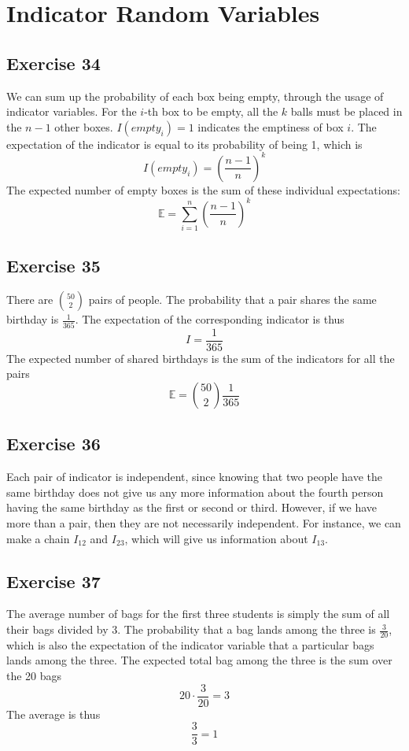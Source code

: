 \documentclass{book}
\begin{document}
\section{Indicator Random Variables}

\subsection*{Exercise 34}
We can sum up the probability of each box being empty, through the usage of indicator variables. For the $i$-th box to be empty, all the $k$ balls must be placed in the $n - 1$ other boxes. $I(empty_i) = 1$ indicates the emptiness of box $i$. The expectation of the indicator is equal to its probability of being 1, which is
$$I(empty_i) = \left( \frac{n - 1}{n} \right)^k$$
The expected number of empty boxes is the sum of these individual expectations:
$$\mathbb{E} = \sum_{i = 1}^n \left( \frac{n - 1}{n} \right)^k$$

\subsection*{Exercise 35}
There are $\binom{50}{2}$ pairs of people. The probability that a pair shares the same birthday is $\frac{1}{365}$. The expectation of the corresponding indicator is thus
$$I = \frac{1}{365}$$
The expected number of shared birthdays is the sum of the indicators for all the pairs
$$\mathbb{E} = \binom{50}{2} \frac{1}{365}$$

\subsection*{Exercise 36}
Each pair of indicator is independent, since knowing that two people have the same birthday does not give us any more information about the fourth person having the same birthday as the first or second or third. However, if we have more than a pair, then they are not necessarily independent. For instance, we can make a chain $I_{12}$ and $I_{23}$, which will give us information about $I_{13}$.

\subsection*{Exercise 37}
The average number of bags for the first three students is simply the sum of all their bags divided by 3. The probability that a bag lands among the three is $\frac{3}{20}$, which is also the expectation of the indicator variable that a particular bags lands among the three. The expected total bag among the three is the sum over the 20 bags
$$20 \cdot \frac{3}{20} = 3$$
The average is thus
$$\frac{3}{3} = 1$$
\end{document}
